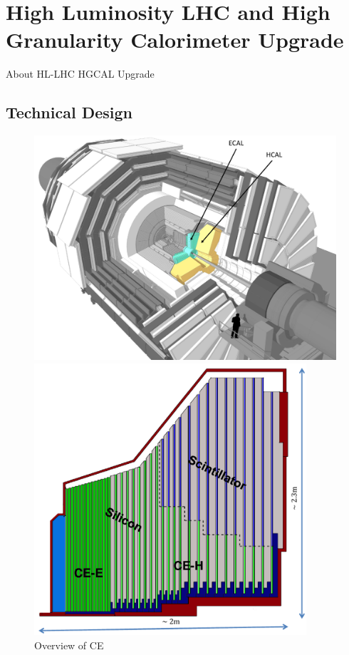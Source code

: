 \chapter{
  High Luminosity LHC and High Granularity Calorimeter Upgrade
 }\label{ch_hgcal}

About \gls{HL-LHC} \gls{HGCAL} Upgrade

\section{
  Technical Design
 }

\begin{figure}[!ht]
  \centering
  \begin{minipage}[c]{0.49\textwidth}
    \includegraphics[width=\textwidth]{figures/hgcal/hgcal_place.pdf}
  \end{minipage}
  \begin{minipage}[c]{0.49\textwidth}
    \includegraphics[width=0.9\textwidth]{figures/hgcal/hgcal_quadrant.pdf}
  \end{minipage}
  \caption[Overview of CE]%
  {Overview of CE~\cite{image-cms-hgcal-quadrant-layout,image-cms-hgcal-place}}%
  \label{fig:cms-hgcal-quadrant-layout}
\end{figure}

